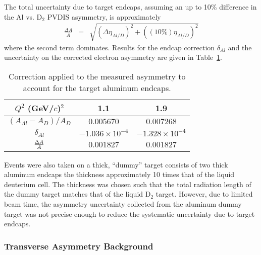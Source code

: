 The total uncertainty due to target endcaps, assuming an up to 10\% difference in the Al vs. D$_2$ PVDIS
asymmetry, is approximately
\begin{eqnarray}
  \frac{\Delta A}{A} &=& \sqrt{\left(\Delta\eta_{Al/D}\right)^2+\left((10\%)\eta_{Al/D}\right)^2}
\end{eqnarray}
where the second term dominates.
Results for the endcap correction $\delta_{Al}$ and the uncertainty on the corrected electron asymmetry are
given in Table~\ref{tab:albg}.
\begin{table}
 \caption{Correction applied to the measured asymmetry to account for the target
aluminum endcaps.}\label{tab:albg}
 \begin{center}
\begin{tabular}{c|c|c}\hline
  $Q^2$ (GeV/$c$)$^2$ & 1.1 & 1.9 \\\hline
  $(A_{Al}-A_D)/A_D$  & $0.005670$ & $0.007268$ \\
  $\delta_{Al}$       & $-1.036\times 10^{-4}$ & $-1.328\times 10^{-4}$ \\
  ${\Delta A}\over{A}$ & $0.001827$ & $0.001827$\\\hline
\end{tabular}
 \end{center}
\end{table}


Events were also taken on a thick, ``dummy'' target consists of two thick aluminum endcaps the thickness
approximately 10 times that of the liquid deuterium cell. The thickness was chosen such that the total radiation
length of the dummy target matches that of the liquid D$_2$ target. However, due to limited beam time, 
the asymmetry uncertainty collected from the aluminum dummy target was not precise enough to reduce
the systematic uncertainty due to target endcaps.

\subsubsection{Transverse Asymmetry Background}

